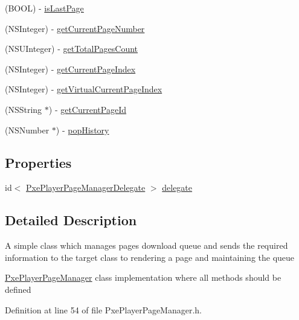 \begin{DoxyCompactItemize}
\item 
(B\-O\-O\-L) -\/ \hyperlink{interface_pxe_player_page_manager_ad6efc3fb86987d93e9dbc66de3e2e0c2}{is\-Last\-Page}
\item 
(N\-S\-Integer) -\/ \hyperlink{interface_pxe_player_page_manager_ae10baa45f460312dc9220334f6658d10}{get\-Current\-Page\-Number}
\item 
(N\-S\-U\-Integer) -\/ \hyperlink{interface_pxe_player_page_manager_a052fc55b8da41bde1a68cdd70be2fac9}{get\-Total\-Pages\-Count}
\item 
(N\-S\-Integer) -\/ \hyperlink{interface_pxe_player_page_manager_ae71c769ffff71a00e03d28ad618232f7}{get\-Current\-Page\-Index}
\item 
(N\-S\-Integer) -\/ \hyperlink{interface_pxe_player_page_manager_a5de236ad53cb1a1f0317b37b574ca80c}{get\-Virtual\-Current\-Page\-Index}
\item 
(N\-S\-String $\ast$) -\/ \hyperlink{interface_pxe_player_page_manager_ac95267a16f83a65107f5994a1cfb36ef}{get\-Current\-Page\-Id}
\item 
(N\-S\-Number $\ast$) -\/ \hyperlink{interface_pxe_player_page_manager_a557a12a6602edf9850a6d8732509bbfe}{pop\-History}
\end{DoxyCompactItemize}
\subsection*{Properties}
\begin{DoxyCompactItemize}
\item 
id$<$ \hyperlink{protocol_pxe_player_page_manager_delegate-p}{Pxe\-Player\-Page\-Manager\-Delegate} $>$ \hyperlink{interface_pxe_player_page_manager_a7951815ab7a221d5150dc74a1fb10606}{delegate}
\end{DoxyCompactItemize}


\subsection{Detailed Description}
A simple class which manages pages download queue and sends the required information to the target class to rendering a page and maintaining the queue

\hyperlink{interface_pxe_player_page_manager}{Pxe\-Player\-Page\-Manager} class implementation where all methods should be defined 

Definition at line 54 of file Pxe\-Player\-Page\-Manager.\-h.




